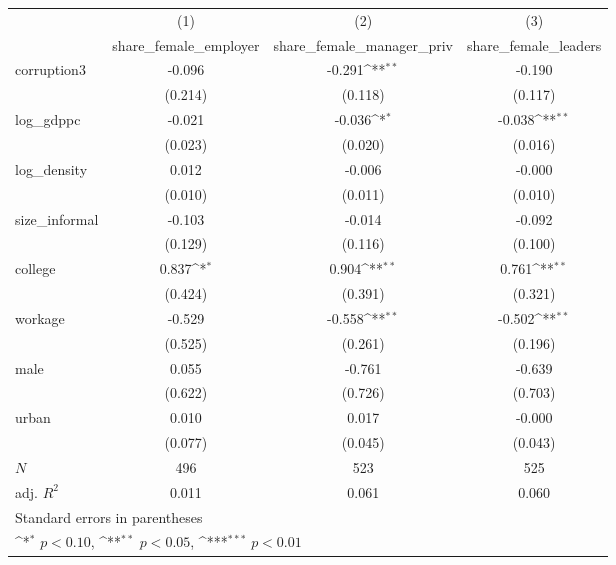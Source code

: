 {
\def\sym#1{\ifmmode^{#1}\else\(^{#1}\)\fi}
\begin{tabular}{l*{3}{c}}
\hline\hline
            &\multicolumn{1}{c}{(1)}&\multicolumn{1}{c}{(2)}&\multicolumn{1}{c}{(3)}\\
            &\multicolumn{1}{c}{share\_female\_employer}&\multicolumn{1}{c}{share\_female\_manager\_priv}&\multicolumn{1}{c}{share\_female\_leaders}\\
\hline
corruption3 &      -0.096         &      -0.291\sym{**} &      -0.190         \\
            &     (0.214)         &     (0.118)         &     (0.117)         \\
[1em]
log\_gdppc   &      -0.021         &      -0.036\sym{*}  &      -0.038\sym{**} \\
            &     (0.023)         &     (0.020)         &     (0.016)         \\
[1em]
log\_density &       0.012         &      -0.006         &      -0.000         \\
            &     (0.010)         &     (0.011)         &     (0.010)         \\
[1em]
size\_informal&      -0.103         &      -0.014         &      -0.092         \\
            &     (0.129)         &     (0.116)         &     (0.100)         \\
[1em]
college     &       0.837\sym{*}  &       0.904\sym{**} &       0.761\sym{**} \\
            &     (0.424)         &     (0.391)         &     (0.321)         \\
[1em]
workage     &      -0.529         &      -0.558\sym{**} &      -0.502\sym{**} \\
            &     (0.525)         &     (0.261)         &     (0.196)         \\
[1em]
male        &       0.055         &      -0.761         &      -0.639         \\
            &     (0.622)         &     (0.726)         &     (0.703)         \\
[1em]
urban       &       0.010         &       0.017         &      -0.000         \\
            &     (0.077)         &     (0.045)         &     (0.043)         \\
\hline
\(N\)       &         496         &         523         &         525         \\
adj. \(R^{2}\)&       0.011         &       0.061         &       0.060         \\
\hline\hline
\multicolumn{4}{l}{\footnotesize Standard errors in parentheses}\\
\multicolumn{4}{l}{\footnotesize \sym{*} \(p<0.10\), \sym{**} \(p<0.05\), \sym{***} \(p<0.01\)}\\
\end{tabular}
}
